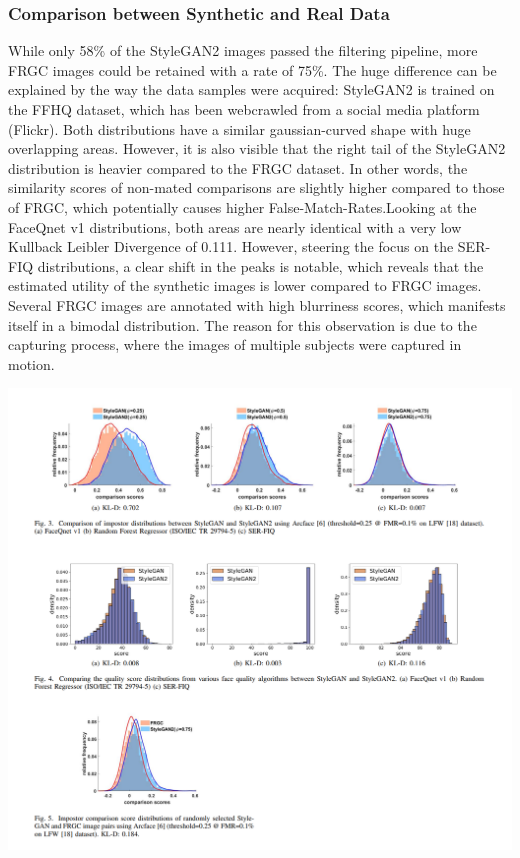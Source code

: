 \documentclass[12pt]{article}
\begin{document}
\subsubsection{Comparison between Synthetic and Real Data}
While
only 58\% of the StyleGAN2 images passed the filtering
pipeline, more FRGC images could be retained with a rate
of 75\%. The huge difference can be explained by the way
the data samples were acquired: StyleGAN2 is trained on
the FFHQ dataset, which has been webcrawled from a social media platform (Flickr). Both distributions have a
similar gaussian-curved shape with huge overlapping areas.
However, it is also visible that the right tail of the StyleGAN2
distribution is heavier compared to the FRGC dataset. In other
words, the similarity scores of non-mated comparisons are
slightly higher compared to those of FRGC, which potentially
causes higher False-Match-Rates.Looking at the FaceQnet v1 distributions,
both areas are nearly identical with a very low Kullback
Leibler Divergence of 0.111. However, steering the focus
on the SER-FIQ distributions, a clear shift in the peaks is
notable, which reveals that the estimated utility of the synthetic
images is lower compared to FRGC images. Several FRGC images
are annotated with high blurriness scores, which manifests
itself in a bimodal distribution. The reason for this observation
is due to the capturing process, where the images of multiple
subjects were captured in motion.
\begin{center}
  \includegraphics[scale = 0.9]{img9.png}
\end{center}
\end{document}
